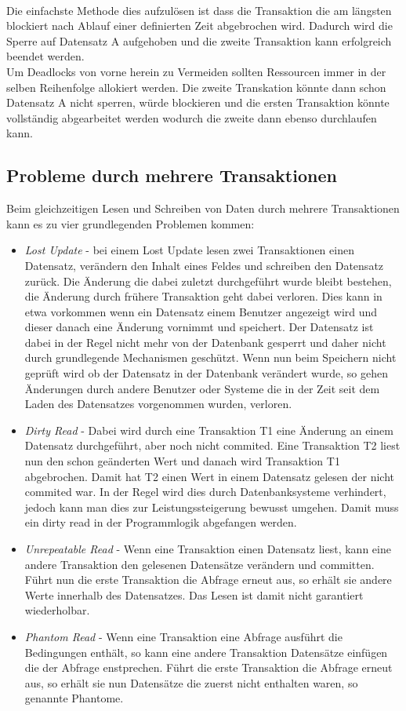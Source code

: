 \\Die einfachste Methode dies aufzulösen ist dass die Transaktion die am längsten blockiert nach Ablauf einer definierten Zeit abgebrochen wird. Dadurch wird die Sperre auf Datensatz A aufgehoben und die zweite Transaktion kann erfolgreich beendet werden.\parencite[S. 139ff]{WeikumVossen02}
\\Um Deadlocks von vorne herein zu Vermeiden sollten Ressourcen immer in der selben Reihenfolge allokiert werden. Die zweite Transkation könnte dann schon Datensatz A nicht sperren, würde blockieren und die ersten Transaktion könnte vollständig abgearbeitet werden wodurch die zweite dann ebenso durchlaufen kann.


\subsection{Probleme durch mehrere Transaktionen}\label{subs:isolation}
Beim gleichzeitigen Lesen und Schreiben von Daten durch mehrere Transaktionen kann es zu vier grundlegenden Problemen kommen:
\begin{itemize}
	\item \emph{Lost Update} - bei einem Lost Update lesen zwei Transaktionen einen Datensatz, verändern den Inhalt eines Feldes und schreiben den Datensatz zurück. Die Änderung die dabei zuletzt durchgeführt wurde bleibt bestehen, die Änderung durch frühere Transaktion geht dabei verloren. Dies kann in etwa vorkommen wenn ein Datensatz einem Benutzer angezeigt wird und dieser danach eine Änderung vornimmt und speichert. Der Datensatz ist dabei in der Regel nicht mehr von der Datenbank gesperrt und daher nicht durch grundlegende Mechanismen geschützt. Wenn nun beim Speichern nicht geprüft wird ob der Datensatz in der Datenbank verändert wurde, so gehen Änderungen durch andere Benutzer oder Systeme die in der Zeit seit dem Laden des Datensatzes vorgenommen wurden, verloren.\parencite[S. 415f]{dbgrund}
	\item \emph{Dirty Read} - Dabei wird durch eine Transaktion T1 eine Änderung an einem Datensatz durchgeführt, aber noch nicht commited. Eine Transaktion T2 liest nun den schon geänderten Wert und danach wird Transaktion T1 abgebrochen. Damit hat T2 einen Wert in einem Datensatz gelesen der nicht commited war. In der Regel wird dies durch Datenbanksysteme verhindert, jedoch kann man dies zur Leistungssteigerung bewusst umgehen. Damit muss ein dirty read in der Programmlogik abgefangen werden.\parencite[S. 439]{dbgrund}
	\item \emph{Unrepeatable Read} - Wenn eine Transaktion einen Datensatz liest, kann eine andere Transaktion den gelesenen Datensätze verändern und committen. Führt nun die erste Transaktion die Abfrage erneut aus, so erhält sie andere Werte innerhalb des Datensatzes. Das Lesen ist damit nicht garantiert wiederholbar.\parencite[S. 439]{dbgrund}
	\item \emph{Phantom Read} - Wenn eine Transaktion eine Abfrage ausführt die Bedingungen enthält, so kann eine andere Transaktion Datensätze einfügen die der Abfrage enstprechen. Führt die erste Transaktion die Abfrage erneut aus, so erhält sie nun Datensätze die zuerst nicht enthalten waren, so genannte Phantome.\parencite[S. 439]{dbgrund}	
\end{itemize}
